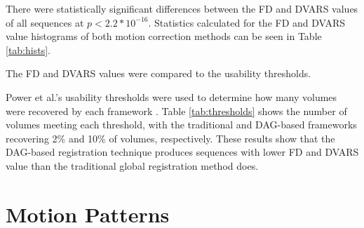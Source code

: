 There were statistically significant differences between the FD and DVARS values of all sequences at $p < 2.2*10^{-16}$. Statistics calculated for the FD and DVARS value histograms of both motion correction methods can be seen in Table \ref{tab:hists}. 


The FD and DVARS values were compared to the usability thresholds. 

Power et al.'s usability thresholds were used to determine how many volumes were recovered by each framework \cite{Power2014}. Table \ref{tab:thresholds} shows the number of volumes meeting each threshold, with the traditional and DAG-based frameworks recovering 2\% and 10\% of volumes, respectively. These results show that the DAG-based registration technique produces sequences with lower FD and DVARS value than the traditional global registration method does.

\section{Motion Patterns}
